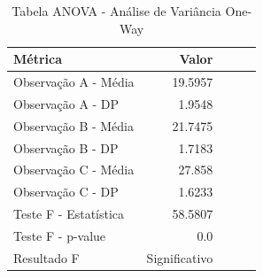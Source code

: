 \begin{table}[H]
\centering
\caption{Tabela ANOVA - Análise de Variância One-Way}
\label{tab:anova_oneway}
\begin{tabular}{lrrrr}
\toprule
Métrica & Valor \\
\midrule
Observação A - Média & 19.5957 \\
Observação A - DP & 1.9548 \\
Observação B - Média & 21.7475 \\
Observação B - DP & 1.7183 \\
Observação C - Média & 27.858 \\
Observação C - DP & 1.6233 \\
Teste F - Estatística & 58.5807 \\
Teste F - p-value & 0.0 \\
Resultado F & Significativo \\
\bottomrule
\end{tabular}
\end{table}